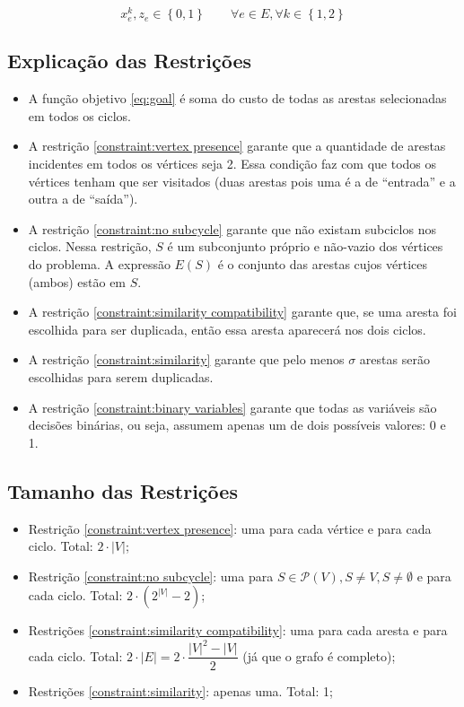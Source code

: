 \documentclass{article}
\newcommand{\Set}[1]{\ensuremath{\left\{#1\right\}}}
\newcommand{\partsof}[1]{\ensuremath{\mathcal{P}\left(#1\right)}}
\newcommand{\abs}[1]{\ensuremath{\left| #1 \right|}}
\newcommand{\binary}{\ensuremath{\Set{0, 1}}}
\newcommand{\edge}{\ensuremath{e}}
\newcommand{\edges}{\ensuremath{E}}
\newcommand{\vertices}{\ensuremath{V}}
\newcommand{\ncycles}{2}
\newcommand{\allCycles}{\ensuremath{\Set{1, \ncycles}}}
\newcommand{\cycle}{\ensuremath{k}}
\newcommand{\subvertices}{\ensuremath{S}}
\newcommand{\X}[2]{\ensuremath{x^{#1}_{#2}}}
\newcommand{\xke}{\ensuremath{\X{\cycle}{\edge}}}
\newcommand{\ze}{\ensuremath{z_{\edge}}}
\newcommand{\similarity}{\ensuremath{\sigma}}
\begin{document}
\begin{equation}
	\label{constraint:binary variables}
	\xke, \ze \in \binary
	\qquad
	\forall \edge \in \edges,
	\forall \cycle \in \allCycles
\end{equation}

\subsection{Explicação das Restrições}
\label{subsec: constraints explanation}

\begin{itemize}
    \item A função objetivo \eqref{eq:goal} é soma do custo de todas as arestas selecionadas em todos os ciclos.
    \item A restrição \eqref{constraint:vertex presence} garante que a quantidade de arestas incidentes em todos os vértices seja 2. Essa condição faz com que todos os vértices tenham que ser visitados (duas arestas pois uma é a de ``entrada'' e a outra a de ``saída'').
    \item A restrição \eqref{constraint:no subcycle} garante que não existam subciclos nos ciclos. Nessa restrição, $\subvertices$ é um subconjunto próprio e não-vazio dos vértices do problema. A expressão $\edges(\subvertices)$ é o conjunto das arestas cujos vértices (ambos) estão em $\subvertices$.
    \item A restrição \eqref{constraint:similarity compatibility} garante que, se uma aresta foi escolhida para ser duplicada, então essa aresta aparecerá nos dois ciclos.
    \item A restrição \eqref{constraint:similarity} garante que pelo menos $\similarity$ arestas serão escolhidas para serem duplicadas.
    \item A restrição \eqref{constraint:binary variables} garante que todas as variáveis são decisões binárias, ou seja, assumem apenas um de dois possíveis valores: 0 e 1.
\end{itemize}

\subsection{Tamanho das Restrições}
\label{subsec:constraints size}

\begin{itemize}
	\item Restrição \eqref{constraint:vertex presence}: uma para cada vértice e para cada ciclo. Total: $\ncycles \cdot \abs{\vertices}$;
	\item Restrição \eqref{constraint:no subcycle}: uma para $\subvertices \in \partsof{\vertices}, \subvertices \neq \vertices, \subvertices \neq \emptyset$ e para cada ciclo. Total: $\ncycles \cdot \left( 2^{\abs{\vertices}} - 2\right)$;
	\item Restrições \eqref{constraint:similarity compatibility}: uma para cada aresta e para cada ciclo. Total: $\ncycles \cdot \abs{\edges} = \ncycles \cdot \dfrac{\abs{\vertices}^2 - \abs{\vertices}}{2}$ (já que o grafo é completo);
	\item Restrições \ref{constraint:similarity}: apenas uma. Total: 1;
\end{itemize}
\end{document}
